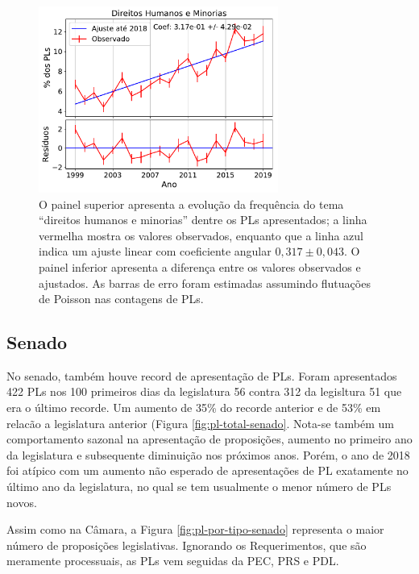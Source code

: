 \documentclass[12pt,a4paper]{article}
\begin{document}
\begin{figure}[H]
\centering
\includegraphics[width=0.7\textwidth]{graficos/PL-direitos-humanos-por-ano_2019-05-01.pdf}
\caption{O painel superior apresenta a evolução da frequência do tema ``direitos humanos e minorias''
  dentre os PLs apresentados; a linha vermelha mostra os valores observados, enquanto que a linha
  azul indica um ajuste linear com coeficiente angular $0,317\pm 0,043$. O painel inferior apresenta
  a diferença entre os valores observados e ajustados. As barras de erro foram estimadas assumindo
  flutuações de Poisson nas contagens de PLs.}
\label{fig:pl-direitos-humanos}
\end{figure}

\subsection{Senado}
\label{sec:temas-senado}

No senado, também houve record de apresentação de PLs. Foram apresentados 422 PLs nos 100 primeiros dias da legislatura 56 contra 312 da legisltura 51 que era o último recorde. Um aumento de 35\% do recorde anterior e de 53\% em relacão a legislatura anterior (Figura \ref{fig:pl-total-senado}. Nota-se também um comportamento sazonal na apresentação de proposições, aumento no primeiro ano da legislatura e subsequente diminuição nos próximos anos. Porém, o ano de 2018 foi atípico com um aumento não esperado de apresentações de PL exatamente no último ano da legislatura, no qual se tem usualmente o menor número de PLs novos.

Assim como na Câmara, a Figura \ref{fig:pl-por-tipo-senado} representa o maior número de proposições legislativas. Ignorando os Requerimentos, que são meramente processuais, as PLs vem seguidas da PEC, PRS e PDL.
\end{document}
